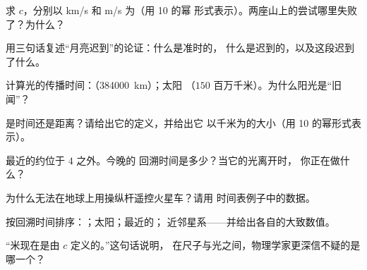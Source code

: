 \begin{exercise}[$\star$]\label{exo:g8:speed-of-light:1}
求 $c$，分别以 \unit{km/s} 和 \unit{m/s} 为（用 10 的幂
形式表示）。两座山上的尝试哪里失败了？为什么？
\end{exercise}

\begin{exercise}[$\star$]\label{exo:g8:speed-of-light:2}
用三句话复述“月亮迟到”的论证：什么是准时的，
什么是迟到的，以及这段迟到了什么。
\end{exercise}

\begin{exercise}[$\star$]\label{exo:g8:speed-of-light:3}
计算光的传播时间：（\qty{384000}{km}）；太阳
（$150$ 百万千米）。为什么阳光是“旧闻”？
\end{exercise}

\begin{exercise}[$\star$]\label{exo:g8:speed-of-light:4}
是时间还是距离？请给出它的定义，并给出它
以千米为的大小（用 10 的幂形式表示）。
\end{exercise}

\begin{exercise}[$\star$]\label{exo:g8:speed-of-light:5}
最近的约位于 $4$ 之外。今晚的
回溯时间是多少？当它的光离开时，
你正在做什么？
\end{exercise}

\begin{exercise}[$\star$]\label{exo:g8:speed-of-light:6}
为什么无法在地球上用操纵杆遥控火星车？请用
时间表例子中的数据。
\end{exercise}

\begin{exercise}[$\star$]\label{exo:g8:speed-of-light:7}
按回溯时间排序：；太阳；最近的；
近邻星系——并给出各自的大致数值。
\end{exercise}

\begin{exercise}[$\star$]\label{exo:g8:speed-of-light:8}
“米现在是由 $c$ 定义的。”这句话说明，
在尺子与光之间，物理学家更深信不疑的是
哪一个？
\end{exercise}

